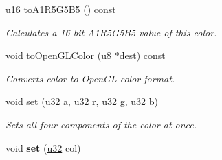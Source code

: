 \begin{DoxyCompactItemize}
\hyperlink{namespaceirr_ae9f8ec82692ad3b83c21f555bfa70bcc}{u16} \hyperlink{classirr_1_1video_1_1SColor_a9a6ad04081a1b15c07746cf84a971565}{to\+A1\+R5\+G5\+B5} () const 
\begin{DoxyCompactList}\small\item\em Calculates a 16 bit A1\+R5\+G5\+B5 value of this color. \end{DoxyCompactList}\item 
void \hyperlink{classirr_1_1video_1_1SColor_a0196acc3dfded9f6161c41f0065267c1}{to\+Open\+G\+L\+Color} (\hyperlink{namespaceirr_a646874f69af8ff87fc10201b0254a761}{u8} $\ast$dest) const 
\begin{DoxyCompactList}\small\item\em Converts color to Open\+GL color format. \end{DoxyCompactList}\item 
void \hyperlink{classirr_1_1video_1_1SColor_a8cf295c05c7406cc249843acbb31ec5f}{set} (\hyperlink{namespaceirr_a0416a53257075833e7002efd0a18e804}{u32} a, \hyperlink{namespaceirr_a0416a53257075833e7002efd0a18e804}{u32} r, \hyperlink{namespaceirr_a0416a53257075833e7002efd0a18e804}{u32} g, \hyperlink{namespaceirr_a0416a53257075833e7002efd0a18e804}{u32} b)
\begin{DoxyCompactList}\small\item\em Sets all four components of the color at once. \end{DoxyCompactList}\item 
void {\bfseries set} (\hyperlink{namespaceirr_a0416a53257075833e7002efd0a18e804}{u32} col)\hypertarget{classirr_1_1video_1_1SColor_a4966581260a89f10386bf9d06239c341}{}\label{classirr_1_1video_1_1SColor_a4966581260a89f10386bf9d06239c341}


\end{DoxyCompactItemize}
